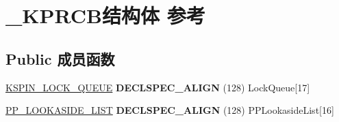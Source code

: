 \hypertarget{struct___k_p_r_c_b}{}\section{\+\_\+\+K\+P\+R\+C\+B结构体 参考}
\label{struct___k_p_r_c_b}
\subsection*{Public 成员函数}
\begin{DoxyCompactItemize}
\item 
\mbox{\label{struct___k_p_r_c_b_ac9c53a4c014e079cd49301652027968a}} 
\hyperlink{struct___k_s_p_i_n___l_o_c_k___q_u_e_u_e}{K\+S\+P\+I\+N\+\_\+\+L\+O\+C\+K\+\_\+\+Q\+U\+E\+UE} {\bfseries D\+E\+C\+L\+S\+P\+E\+C\+\_\+\+A\+L\+I\+GN} (128) Lock\+Queue\mbox{[}17\mbox{]}
\item 
\mbox{\label{struct___k_p_r_c_b_aae34f034a618eb09c439e5681af7c198}} 
\hyperlink{struct___p_p___l_o_o_k_a_s_i_d_e___l_i_s_t}{P\+P\+\_\+\+L\+O\+O\+K\+A\+S\+I\+D\+E\+\_\+\+L\+I\+ST} {\bfseries D\+E\+C\+L\+S\+P\+E\+C\+\_\+\+A\+L\+I\+GN} (128) P\+P\+Lookaside\+List\mbox{[}16\mbox{]}
\end{DoxyCompactItemize}
